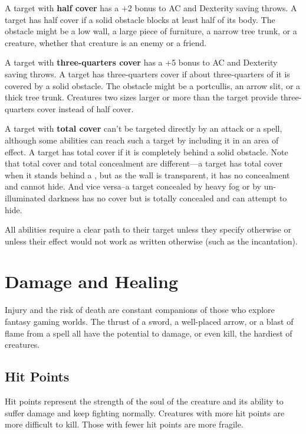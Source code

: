 A target with \textbf{half cover} has a +2 bonus to AC and Dexterity saving throws. A target has half cover if a solid obstacle blocks at least half of its body. The obstacle might be a low wall, a large piece of furniture, a narrow tree trunk, or a creature, whether that creature is an enemy or a friend.

A target with \textbf{three-quarters cover} has a +5 bonus to AC and Dexterity saving throws. A target has three-quarters cover if about three-quarters of it is covered by a solid obstacle. The obstacle might be a portcullis, an arrow slit, or a thick tree trunk. Creatures two sizes larger or more than the target provide three-quarters cover instead of half cover. 

A target with \textbf{total cover} can't be targeted directly by an attack or a spell, although some abilities can reach such a target by including it in an area of effect. A target has total cover if it is completely behind a solid obstacle. Note that total cover and total concealment are different---a target has total cover when it stands behind a , but as the wall is transparent, it has no concealment and cannot hide. And vice versa--a target concealed by heavy fog or by un-illuminated darkness has no cover but is totally concealed and can attempt to hide.

All abilities require a clear path to their target unless they specify otherwise or unless their effect would not work as written otherwise (such as the  incantation). 

\section{Damage and Healing}

Injury and the risk of death are constant companions of those who explore fantasy gaming worlds. The thrust of a sword, a well-placed arrow, or a blast of flame from a  spell all have the potential to damage, or even kill, the hardiest of creatures.

\subsection{Hit Points}

Hit points represent the strength of the soul of the creature and its ability to suffer damage and keep fighting normally. Creatures with more hit points are more difficult to kill. Those with fewer hit points are more fragile.

